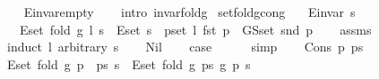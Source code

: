 \begin{isabellebody}
\endisataginvisible
{\isafoldinvisible}%
%
\isadeliminvisible
%
\endisadeliminvisible
\isanewline
%
\isadelimproof
\ \ %
\endisadelimproof
%
\isatagproof
{}\isamarkupfalse%
\ E{\isachardot}{\kern0pt}invar{\isacharunderscore}{\kern0pt}empty\isanewline
\ \ \isamarkupfalse%
\ {\isacharparenleft}{\kern0pt}intro\ invar{\isacharunderscore}{\kern0pt}fold{\isacharunderscore}{\kern0pt}g{\isacharparenright}{\kern0pt}%
\endisatagproof
{\isafoldproof}%
%
\isadelimproof
%
\endisadelimproof
\isanewline
%
\isadeliminvisible
\isanewline
%
\endisadeliminvisible
%
\isataginvisible
{}\isamarkupfalse%
\ set{\isacharunderscore}{\kern0pt}fold{\isacharunderscore}{\kern0pt}g{\isacharunderscore}{\kern0pt}cong{\isacharcolon}{\kern0pt}\isanewline
\ \ \ {\isachardoublequoteopen}E{\isachardot}{\kern0pt}invar\ s{\isachardoublequoteclose}\isanewline
\ \ \ {\isachardoublequoteopen}E{\isachardot}{\kern0pt}set\ {\isacharparenleft}{\kern0pt}fold\ g\ l\ s{\isacharparenright}{\kern0pt}\ {\isacharequal}{\kern0pt}\ E{\isachardot}{\kern0pt}set\ s\ {\isasymunion}\ {\isacharparenleft}{\kern0pt}{\isasymUnion}p{\isasymin}set\ l{\isachardot}{\kern0pt}\ {\isacharbraceleft}{\kern0pt}fst\ p{\isacharbraceright}{\kern0pt}\ {\isasymtimes}\ G{\isachardot}{\kern0pt}S{\isachardot}{\kern0pt}set\ {\isacharparenleft}{\kern0pt}snd\ p{\isacharparenright}{\kern0pt}{\isacharparenright}{\kern0pt}{\isachardoublequoteclose}%
\endisataginvisible
{\isafoldinvisible}%
%
\isadeliminvisible
%
\endisadeliminvisible
\isanewline
%
\isadelimproof
\ \ %
\endisadelimproof
%
\isatagproof
{}\isamarkupfalse%
\ assms\isanewline
{}\isamarkupfalse%
\ {\isacharparenleft}{\kern0pt}induct\ l\ arbitrary{\isacharcolon}{\kern0pt}\ s{\isacharparenright}{\kern0pt}\isanewline
\ \ \isamarkupfalse%
\ Nil\isanewline
\ \ \isamarkupfalse%
\ {\isacharquery}{\kern0pt}case\isanewline
\ \ \ \ \isamarkupfalse%
\ simp\isanewline
{}\isamarkupfalse%
\isanewline
\ \ \isamarkupfalse%
\ {\isacharparenleft}{\kern0pt}Cons\ p\ ps{\isacharparenright}{\kern0pt}\isanewline
\ \ \isamarkupfalse%
\ {\isachardoublequoteopen}E{\isachardot}{\kern0pt}set\ {\isacharparenleft}{\kern0pt}fold\ g\ {\isacharparenleft}{\kern0pt}p\ {\isacharhash}{\kern0pt}\ ps{\isacharparenright}{\kern0pt}\ s{\isacharparenright}{\kern0pt}\ {\isacharequal}{\kern0pt}\ E{\isachardot}{\kern0pt}set\ {\isacharparenleft}{\kern0pt}fold\ g\ ps\ {\isacharparenleft}{\kern0pt}g\ p\ s{\isacharparenright}{\kern0pt}{\isacharparenright}{\kern0pt}{\isachardoublequoteclose}\isanewline

\end{isabellebody}

